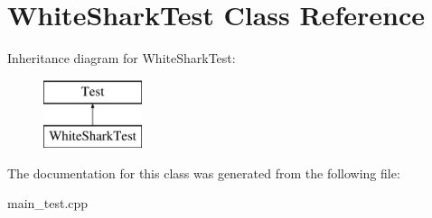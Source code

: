 \hypertarget{class_white_shark_test}{}\section{White\+Shark\+Test Class Reference}
\label{class_white_shark_test}
Inheritance diagram for White\+Shark\+Test\+:\begin{figure}[H]
\begin{center}
\leavevmode
\includegraphics[height=2.000000cm]{class_white_shark_test}
\end{center}
\end{figure}


The documentation for this class was generated from the following file\+:\begin{DoxyCompactItemize}
\item 
main\+\_\+test.\+cpp\end{DoxyCompactItemize}
